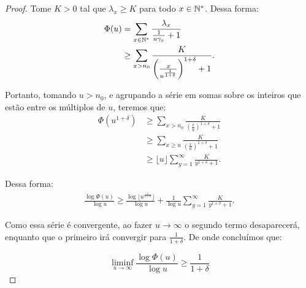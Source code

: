 \begin{proof}
  Tome $K > 0$ tal que $\lambda_x \geq K$ para todo $x \in {\mathbb{N^*}}$. Dessa
  forma:
  \begin{align*}
    \Phi(u) &= \sum_{x \in {\mathbb{N^*}}} \frac{\lambda_x}{\frac{1}{u\gamma_x} +
      1}\\
    &\geq \sum_{x > n_0}
    \frac{K}{\left(\frac{x}{u^{\frac{1}{1+\delta}}}\right)^{1+\delta} +1}.
  \end{align*}

  Portanto, tomando $u > n_0$, e agrupando a série em somas sobre os inteiros
  que estão entre os múltiplos de $u$, teremos que:
  \begin{align*}
    \Phi(u^{1+\delta}) 
    &\geq \sum_{x > n_0}
    \frac{K}{\left(\frac{x}{u}\right)^{1+\delta} +1}\\
    &\geq \sum_{x \geq u}
    \frac{K}{\left(\frac{x}{u}\right)^{1+\delta} +1}\\
    &\geq \lfloor u \rfloor \sum_{y = 1}^{\infty}
    \frac{K}{y^{1+\delta} + 1}.
  \end{align*}

  Dessa forma:
  \begin{align*}
    \frac{\log \Phi(u)}{\log u} \geq \frac{\log\lfloor
      u^{\frac{1}{1+\delta}} \rfloor }{\log u} + 
    \frac{1}{\log u} \sum_{y = 1}^{\infty}
    \frac{K}{y^{1+\delta} + 1}.
  \end{align*}

  Como essa série é convergente, ao fazer $u \to \infty$ o segundo
  termo desaparecerá, enquanto que o primeiro irá convergir para
  $\frac{1}{1+\delta}$. De onde concluímos que:

  \begin{displaymath}
    \liminf_{u \to \infty} \frac{\log \Phi (u)}{\log u} \geq \frac{1}{1+\delta}
  \end{displaymath}
\end{proof}

